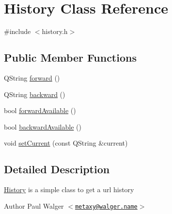 \hypertarget{classHistory}{
\section{History Class Reference}
\label{classHistory}
}


{\ttfamily \#include $<$history.h$>$}\subsection*{Public Member Functions}
\begin{DoxyCompactItemize}
\item 
QString \hyperlink{classHistory_a83d69c4bfe79d19a6187f586e7311b22}{forward} ()
\item 
QString \hyperlink{classHistory_a41c8d23cb2789b07bc6229b203bafce3}{backward} ()
\item 
bool \hyperlink{classHistory_a1227493ba04f3f640c6648b9562bf68e}{forwardAvailable} ()
\item 
bool \hyperlink{classHistory_ac8c3f249e76605c9686eacb4716c79b4}{backwardAvailable} ()
\item 
void \hyperlink{classHistory_a7fd72e5b7289c61f32ec5d533d0356bf}{setCurrent} (const QString \&current)
\end{DoxyCompactItemize}


\subsection{Detailed Description}
\hyperlink{classHistory}{History} is a simple class to get a url history

\begin{DoxyAuthor}{Author}
Paul Walger $<$\href{mailto:metaxy@walger.name}{\tt metaxy@walger.name}$>$ 
\end{DoxyAuthor}


